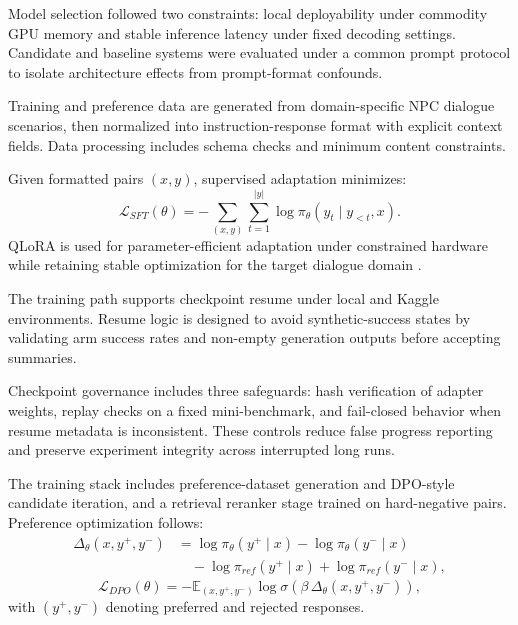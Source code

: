 ﻿\documentclass[a4paper,12pt]{article}
\begin{document}
Model selection followed two constraints: local deployability under commodity GPU memory and stable inference latency under fixed decoding settings. Candidate and baseline systems were evaluated under a common prompt protocol to isolate architecture effects from prompt-format confounds.

Training and preference data are generated from domain-specific NPC dialogue scenarios, then normalized into instruction-response format with explicit context fields. Data processing includes schema checks and minimum content constraints.

Given formatted pairs \((x,y)\), supervised adaptation minimizes:
\begin{equation}
\mathcal{L}_{SFT}(\theta) = -\sum_{(x,y)}\sum_{t=1}^{|y|}\log \pi_\theta(y_t\mid y_{<t},x).
\end{equation}
QLoRA is used for parameter-efficient adaptation under constrained hardware while retaining stable optimization for the target dialogue domain \cite{Dettmers2023QLoRA}.

The training path supports checkpoint resume under local and Kaggle environments. Resume logic is designed to avoid synthetic-success states by validating arm success rates and non-empty generation outputs before accepting summaries.

Checkpoint governance includes three safeguards: hash verification of adapter weights, replay checks on a fixed mini-benchmark, and fail-closed behavior when resume metadata is inconsistent. These controls reduce false progress reporting and preserve experiment integrity across interrupted long runs.

The training stack includes preference-dataset generation and DPO-style candidate iteration, and a retrieval reranker stage trained on hard-negative pairs. Preference optimization follows:
\begin{equation}
\begin{aligned}
\Delta_\theta(x,y^+,y^-)
&= \log \pi_\theta(y^+\mid x)-\log \pi_\theta(y^-\mid x) \\
&\quad -\log \pi_{ref}(y^+\mid x)+\log \pi_{ref}(y^-\mid x),
\end{aligned}
\end{equation}
\begin{equation}
\mathcal{L}_{DPO}(\theta)=
-\mathbb{E}_{(x,y^+,y^-)}\log \sigma\!\left(\beta\,\Delta_\theta(x,y^+,y^-)\right),
\end{equation}
with \((y^+,y^-)\) denoting preferred and rejected responses.
\end{document}
